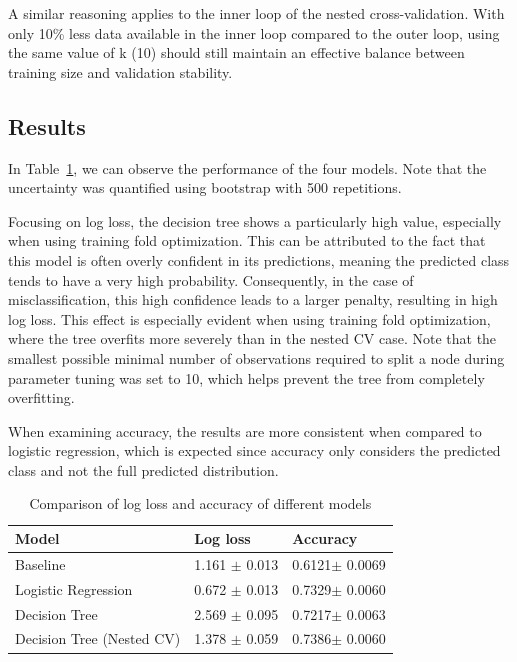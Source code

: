 \documentclass[9pt]{IEEEtran}
\begin{document}
A similar reasoning applies to the inner loop of the nested cross-validation. 
With only 10\% less data available in the inner loop compared to 
the outer loop, using the same value of k (10) should still maintain 
 an effective balance between training size and validation 
stability.

\subsection{Results}
In Table~\ref{tab:results}, we can observe the performance of the four models. 
Note that the uncertainty was quantified using bootstrap with 500 repetitions.

Focusing on log loss, the decision tree shows a particularly high value,
 especially when using training fold optimization. This can be attributed
  to the fact that this model is often overly confident in its predictions, 
  meaning the predicted class tends to have a very high probability.
   Consequently, in the case of misclassification, this high confidence
    leads to a larger penalty, resulting in high log loss.
     This effect is especially evident when using training fold 
     optimization, where the tree overfits more severely than in the
      nested CV case. Note that the smallest possible minimal number
       of observations required to split a node during parameter tuning
        was set to 10, which helps prevent the tree from completely 
        overfitting.

When examining accuracy, the results are more consistent when 
compared to logistic regression, which is expected since accuracy only
 considers the predicted class and not the full predicted distribution.



 \begin{table}[h]
    \begin{tabular}{l|l|l}
    Model                           & Log loss& Accuracy          \\
    \hline
    Baseline       & 1.161 $\pm$ 0.013    & 0.6121$\pm$  0.0069          \\
    Logistic Regression       & 0.672 $\pm$ 0.013 & 0.7329$\pm$   0.0060               \\
    Decision Tree  &  2.569 $\pm$ 0.095  & 0.7217$\pm$ 0.0063                \\
    Decision Tree (Nested CV)  &1.378 $\pm$ 0.059 & 0.7386$\pm$ 0.0060  
    \end{tabular}
    \vspace{2px}
    \caption{Comparison of log loss and accuracy of different models}
    \label{tab:results}
\end{table}
\end{document}
